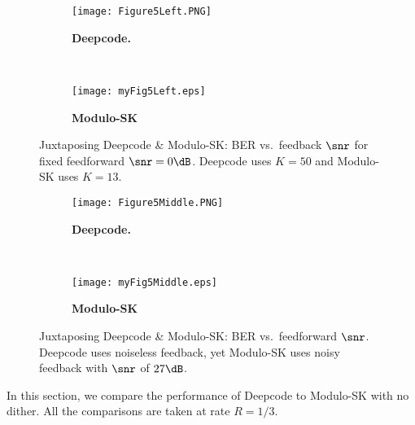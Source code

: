 \begin{figure*}[!ht]
 \centering
 \begin{subfigure}[t]{0.5\textwidth}
 \centering
 \texttt{[image: Figure5Left.PNG]}
 \caption{
 \textbf{Deepcode. \cite[Figure~5 (Left)]{kim2018deepcode}}
 \label{fig:Figure5LeftDeepcode}
 }
 \end{subfigure}
 ~ 
 \begin{subfigure}[t]{0.5\textwidth}
 \centering
 \texttt{[image: myFig5Left.eps]}
 \caption{\textbf{Modulo-SK}
 \label{fig:Figure5LeftMSK}
 }
 \end{subfigure}
 \caption{Juxtaposing Deepcode \& Modulo-SK: BER vs.~feedback $\snr$ for fixed feedforward $\snr=0\dB$. Deepcode uses $K=50$ and Modulo-SK uses $K=13$.
 }
\end{figure*}

\begin{figure*}[!ht]
 \centering
 \begin{subfigure}[t]{0.5\textwidth}
 \centering
 \texttt{[image: Figure5Middle.PNG]}
 \caption{\textbf{Deepcode. \cite[Figure~5 (Middle)]{kim2018deepcode}}
 \label{fig:Figure5middleDeepCode}
 }
 \end{subfigure}
 ~ 
 \begin{subfigure}[t]{0.5\textwidth}
 \centering
 \texttt{[image: myFig5Middle.eps]}
 \caption{\textbf{Modulo-SK}
 \label{fig:Figure5middleModuloSK}
 }
 \end{subfigure}
 \caption{Juxtaposing Deepcode \& Modulo-SK: BER vs.~feedforward $\snr$. Deepcode uses noiseless feedback, yet Modulo-SK uses noisy feedback with $\snr$ of $27\dB$. \label{fig:Figure5middle}}
\end{figure*}
In this section, we compare the performance of Deepcode to Modulo-SK with no dither. All the comparisons are taken at rate $R=1/3$. 

